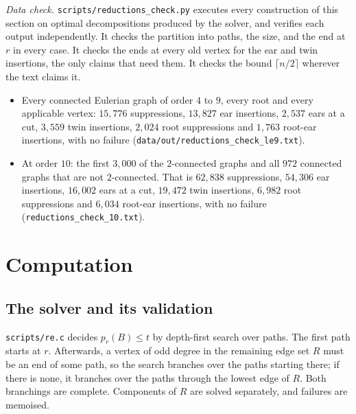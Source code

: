 \documentclass[11pt]{amsart}
\theoremstyle{definition}
\newcommand{\pr}{p_r}
\begin{document}
\emph{Data check.} \texttt{scripts/reductions\_check.py} executes every construction of this section
on optimal decompositions produced by the solver, and verifies each output independently. It checks
the partition into paths, the size, and the end at $r$ in every case. It checks the ends at every old
vertex for the ear and twin insertions, the only claims that need them. It checks the bound $\lceil n/2\rceil$
wherever the text claims it.
\begin{itemize}[leftmargin=*]
\item Every connected Eulerian graph of order $4$ to $9$, every root and every applicable vertex:
$15{,}776$ suppressions, $13{,}827$ ear insertions, $2{,}537$ ears at a cut, $3{,}559$ twin
insertions, $2{,}024$ root suppressions and $1{,}763$ root-ear insertions, with no failure
(\texttt{data/out/reductions\_check\_le9.txt}).
\item At order $10$: the first $3{,}000$ of the $2$-connected graphs and all $972$ connected graphs
that are not $2$-connected. That is $62{,}838$ suppressions, $54{,}306$ ear insertions,
$16{,}002$ ears at a cut, $19{,}472$ twin insertions, $6{,}982$ root suppressions and $6{,}034$ root-ear
insertions, with no failure (\texttt{reductions\_check\_10.txt}).
\end{itemize}

\section{Computation}\label{sec:comp}

\subsection{The solver and its validation}
\texttt{scripts/re.c} decides $\pr(B)\le t$ by depth-first search over paths. The first path starts at
$r$. Afterwards, a vertex of odd degree in the remaining edge set $R$ must be an end of some path, so
the search branches over the paths starting there; if there is none, it branches over the paths
through the lowest edge of $R$. Both branchings are complete. Components of $R$ are solved separately,
and failures are memoised.
\end{document}

